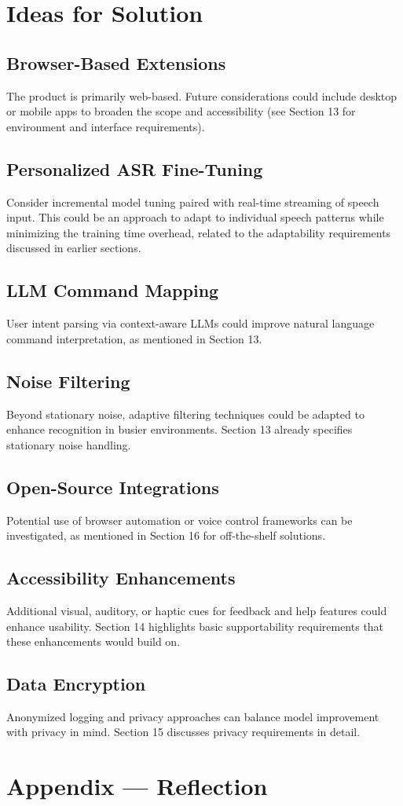 \documentclass[12pt]{article}
\begin{document}
\section{Ideas for Solution}

\subsection{Browser-Based Extensions}
The product is primarily web-based. Future considerations could include desktop or mobile apps to broaden the scope and accessibility (see Section 13 for environment and interface requirements).

\subsection{Personalized ASR Fine-Tuning}
Consider incremental model tuning paired with real-time streaming of speech input. This could be an approach to adapt to individual speech patterns while minimizing the training time overhead, related to the adaptability requirements discussed in earlier sections.

\subsection{LLM Command Mapping}
User intent parsing via context-aware LLMs could improve natural language command interpretation, as mentioned in Section 13.

\subsection{Noise Filtering}
Beyond stationary noise, adaptive filtering techniques could be adapted to enhance recognition in busier environments. Section 13 already specifies stationary noise handling.

\subsection{Open-Source Integrations}
Potential use of browser automation or voice control frameworks can be investigated, as mentioned in Section 16 for off-the-shelf solutions.

\subsection{Accessibility Enhancements}
Additional visual, auditory, or haptic cues for feedback and help features could enhance usability. Section 14 highlights basic supportability requirements that these enhancements would build on.

\subsection{Data Encryption}
Anonymized logging and privacy approaches can balance model improvement with privacy in mind. Section 15 discusses privacy requirements in detail.


\newpage{}
\section*{Appendix --- Reflection}




\end{document}
